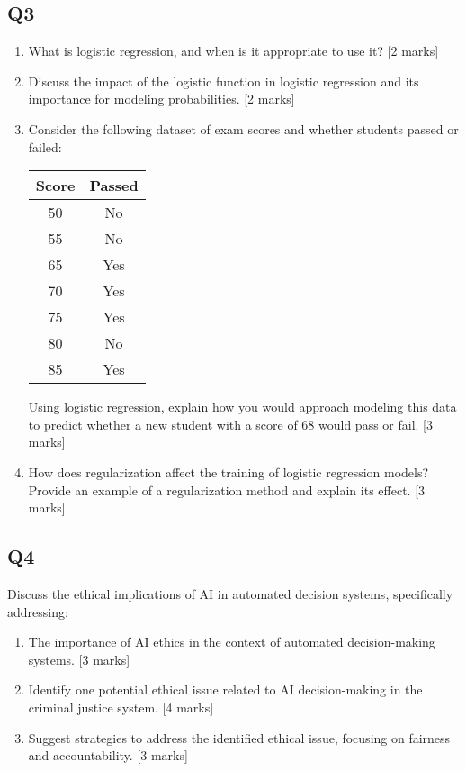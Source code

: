 \documentclass[a4wide]{article}
\begin{document}
\subsection*{Q3}
\begin{enumerate}
\item What is logistic regression, and when is it appropriate to use it? [2 marks]
\item Discuss the impact of the logistic function in logistic regression and its importance for modeling probabilities. [2 marks]
\item Consider the following dataset of exam scores and whether students passed or failed:
\begin{center}
\begin{tabular}{|c|c|}
\hline
Score & Passed \\
\hline
50 & No \\
55 & No \\
65 & Yes \\
70 & Yes \\
75 & Yes \\
80 & No \\
85 & Yes \\
\hline
\end{tabular}
\end{center}
Using logistic regression, explain how you would approach modeling this data to predict whether a new student with a score of 68 would pass or fail. [3 marks]
\item How does regularization affect the training of logistic regression models? Provide an example of a regularization method and explain its effect. [3 marks]
\end{enumerate}

\subsection*{Q4}
Discuss the ethical implications of AI in automated decision systems, specifically addressing:
\begin{enumerate}
\item The importance of AI ethics in the context of automated decision-making systems. [3 marks]
\item Identify one potential ethical issue related to AI decision-making in the criminal justice system. [4 marks]
\item Suggest strategies to address the identified ethical issue, focusing on fairness and accountability. [3 marks]
\end{enumerate}
\end{document}
